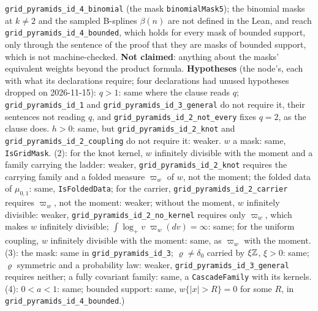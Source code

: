 \begin{proposition}
{\texttt{grid\_pyramids\_id\_4\_binomial} (the mask \texttt{binomialMask5}); the binomial masks at
$k \ne 2$ and the sampled B-splines $\beta(n)$ are not defined in the Lean, and reach
\texttt{grid\_pyramids\_id\_4\_bounded}, which holds for every mask of bounded support, only
through the sentence of the proof that they are masks of bounded support, which is not
machine-checked. \textbf{Not claimed}: anything about the masks' equivalent weights beyond the
product formula. \textbf{Hypotheses} (the node's, each with what its declarations require; four
declarations had unused hypotheses dropped on 2026-11-15): $q > 1$: same where the clause reads
$q$; \texttt{grid\_pyramids\_id\_1} and \texttt{grid\_pyramids\_id\_3\_general} do not require it, their
sentences not reading $q$, and \texttt{grid\_pyramids\_id\_2\_not\_every} fixes $q = 2$, as the
clause does. $h > 0$: same, but \texttt{grid\_pyramids\_id\_2\_knot} and
\texttt{grid\_pyramids\_id\_2\_coupling} do not require it: weaker. $w$ a mask: same,
\texttt{IsGridMask}. (2): for the knot kernel, $w$ infinitely divisible with the moment and a
family carrying the ladder: weaker, \texttt{grid\_pyramids\_id\_2\_knot} requires the carrying family
and a folded \Levy{} measure $\varpi_w$ of $w$, not the moment; the folded data of $\mu_{0,1}$:
same, \texttt{IsFoldedData}; for the carrier, \texttt{grid\_pyramids\_id\_2\_carrier} requires
$\varpi_w$, not the moment: weaker; without the moment, $w$ infinitely divisible: weaker,
\texttt{grid\_pyramids\_id\_2\_no\_kernel} requires only $\varpi_w$, which makes $w$ infinitely
divisible; $\int\log_+v\;\varpi_w(dv) = \infty$: same; for the uniform coupling, $w$ infinitely
divisible with the moment: same, as $\varpi_w$ with the moment. (3): the mask: same in
\texttt{grid\_pyramids\_id\_3}; $\varrho \ne \delta_0$ carried by $\xi\mathbb{Z}$, $\xi > 0$: same;
$\varrho$ symmetric and a probability law: weaker, \texttt{grid\_pyramids\_id\_3\_general} requires
neither; a fully covariant family: same, a \texttt{CascadeFamily} with its kernels. (4):
$0 < a < 1$: same; bounded support: same, $w\{|x| > R\} = 0$ for some $R$, in
\texttt{grid\_pyramids\_id\_4\_bounded}.)}
\end{proposition}

